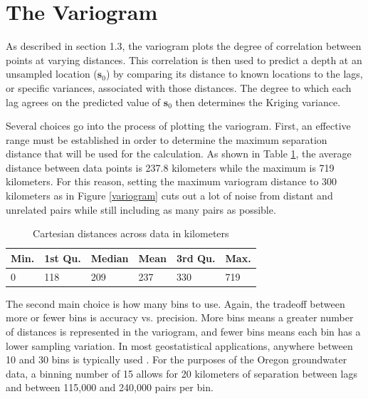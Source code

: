 \documentclass[12pt,twoside]{reedthesis}
\begin{document}
\section{The Variogram}


As described in section 1.3, the variogram plots the degree of correlation between points at varying distances. This correlation is then used to predict a depth at an unsampled location ($\mathbf{s}_0$) by comparing its distance to known locations to the lags, or specific variances, associated with those distances. The degree to which each lag agrees on the predicted value of $\mathbf{s}_0$ then determines the Kriging variance. 

Several choices go into the process of plotting the variogram. First, an effective range must be established in order to determine the maximum separation distance that will be used for the calculation. As shown in Table \ref{dists}, the average distance between data points is 237.8 kilometers while the maximum is 719 kilometers. For this reason, setting the maximum variogram distance to 300 kilometers as in Figure \ref{variogram} cuts out a lot of noise from distant and unrelated pairs while still including as many pairs as possible. 

\begin{table}[h]

\centering

\begin{tabular}{l|l|l|l|l|l}

\hline
Min.  & 1st Qu.  & Median  &   Mean  & 3rd Qu.  &   Max. \\
\hline
  0 & 118 & 209 & 237 & 330 & 719 \\
\hline

\end{tabular}

\caption{Cartesian distances across data in kilometers}
\label{dists}

\end{table}
The second main choice is how many bins to use. Again, the tradeoff between more or fewer bins is accuracy vs. precision. More bins means a greater number of distances is represented in the variogram, and fewer bins means each bin has a lower sampling variation. In most geostatistical applications, anywhere between 10 and 30 bins is typically used \cite{gelfand:2010}. For the purposes of the Oregon groundwater data, a binning number of 15 allows for 20 kilometers of separation between lags and between 115,000 and 240,000 pairs per bin. 
\end{document}
